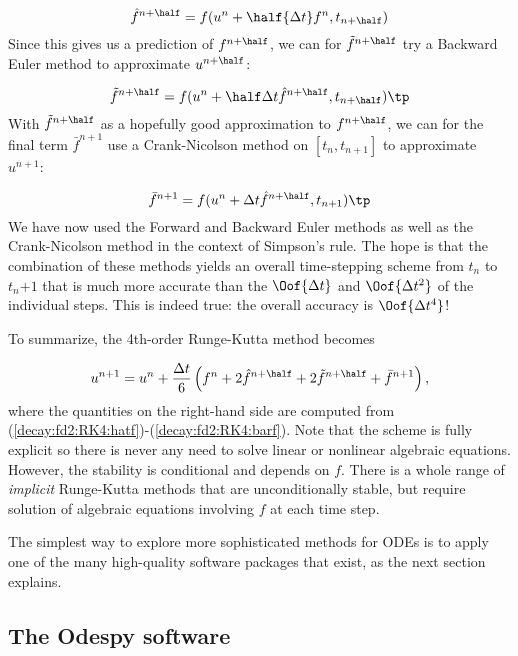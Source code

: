 \documentclass[graybox,sectrefs,envcountresetchap,open=right,final]{svmonodo}
\begin{document}
\begin{equation}
\hat{f}^{n+\half} = f(u^n + \half{\Delta t} f^n, t_{n+\half})
\label{decay:fd2:RK4:hatf}
\end{equation}
Since this gives us a prediction of $f^{n+\half}$, we can for
$\tilde{f}^{n+\half}$ try a Backward Euler method to approximate $u^{n+\half}$:

\begin{equation}
\tilde{f}^{n+\half} = f(u^n + \half\Delta t\hat{f}^{n+\half}, t_{n+\half})\tp
\label{decay:fd2:RK4:tildef}
\end{equation}
With $\tilde{f}^{n+\half}$ as a hopefully good approximation to
$f^{n+\half}$, we can for the final term $\bar{f}^{n+1}$ use
a Crank-Nicolson method on $[t_n, t_{n+1}]$ to approximate $u^{n+1}$:

\begin{equation}
\bar{f}^{n+1} = f(u^n + \Delta t \hat{f}^{n+\half}, t_{n+1})\tp
\label{decay:fd2:RK4:barf}
\end{equation}
We have now used the Forward and Backward Euler methods as well as the
Crank-Nicolson method in the context of Simpson's rule. The hope is
that the combination of these methods yields an overall time-stepping
scheme from $t_n$ to $t_n{+1}$ that is much more accurate than the
$\Oof{\Delta t}$ and $\Oof{\Delta t^2}$ of the individual steps.
This is indeed true: the overall accuracy is $\Oof{\Delta t^4}$!

To summarize, the 4th-order Runge-Kutta method becomes

\begin{equation}
u^{n+1} = u^n +
\frac{\Delta t}{6}\left( f^n + 2\hat{f}^{n+\half}
+ 2\tilde{f}^{n+\half} + \bar{f}^{n+1}\right),
\end{equation}
where the quantities on the right-hand side are computed from
(\ref{decay:fd2:RK4:hatf})-(\ref{decay:fd2:RK4:barf}). Note that
the scheme is fully explicit so there is never any need to solve linear or
nonlinear algebraic
equations. However, the stability is conditional and depends on $f$.
There is a whole range of \emph{implicit} Runge-Kutta methods that
are unconditionally stable, but require solution of algebraic
equations involving $f$ at each time step.

The simplest way to explore more sophisticated methods for ODEs is to
apply one of the many high-quality software packages that exist, as the
next section explains.

\subsection{The Odespy software}
\end{document}
